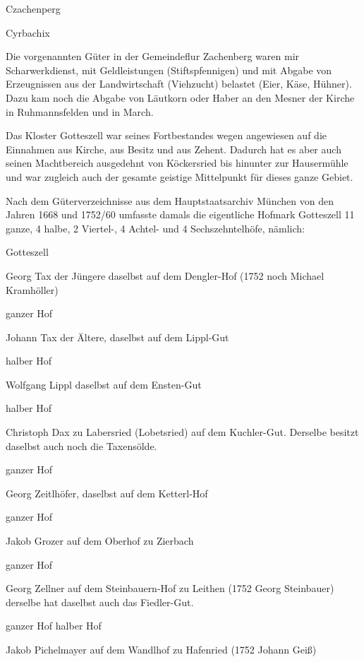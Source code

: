 \documentclass[12pt,a4pager]{book}
\begin{document}
Czachenperg

Cyrbachix

Die vorgenannten Güter in der Gemeindeflur Zachenberg waren mir Scharwerkdienst,
mit Geldleistungen (Stiftspfennigen) und mit Abgabe von Erzeugnissen aus der
Landwirtschaft (Viehzucht) belastet (Eier, Käse, Hühner). Dazu kam noch die
Abgabe von Läutkorn oder Haber an den Mesner der Kirche in Ruhmannsfelden und in
March.

Das Kloster Gotteszell war seines Fortbestandes wegen angewiesen auf die
Einnahmen aus Kirche, aus Besitz und aus Zehent. Dadurch hat es aber auch seinen
Machtbereich ausgedehnt von Köckersried bis hinunter zur Hausermühle und war
zugleich auch der gesamte geistige Mittelpunkt für dieses ganze Gebiet.

Nach dem Güterverzeichnisse aus dem Hauptstaatsarchiv München von den Jahren
1668 und 1752/60 umfasste damals die eigentliche Hofmark Gotteszell 11 ganze, 4
halbe, 2 Viertel-, 4 Achtel- und 4 Sechszehntelhöfe, nämlich:

Gotteszell

Georg Tax der Jüngere daselbst auf dem Dengler-Hof (1752 noch Michael
Kramhöller)

ganzer Hof

Johann Tax der Ältere, daselbst auf dem Lippl-Gut

halber Hof



Wolfgang Lippl daselbst auf dem Ensten-Gut

halber Hof



Christoph Dax zu Labersried (Lobetsried) auf dem Kuchler-Gut. Derselbe besitzt
daselbst auch noch die Taxensölde.

ganzer Hof



Georg Zeitlhöfer, daselbst auf dem Ketterl-Hof

ganzer Hof



Jakob Grozer auf dem Oberhof zu Zierbach

ganzer Hof



Georg Zellner auf dem Steinbauern-Hof zu Leithen (1752 Georg Steinbauer)
derselbe hat daselbst auch das Fiedler-Gut.

ganzer Hof halber Hof



Jakob Pichelmayer auf dem Wandlhof zu Hafenried (1752 Johann Geiß)
\end{document}
